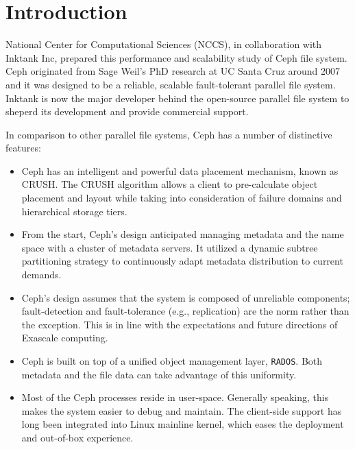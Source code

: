 \documentclass{article}
\begin{document}


\pagebreak
\thispagestyle{empty}
\tableofcontents

\pagebreak
\thispagestyle{empty}
\listoffigures

\clearpage
{}


\section{Introduction}

National Center for Computational Sciences (NCCS), in collaboration with
Inktank Inc, prepared this performance and scalability study of
Ceph file system. Ceph originated from Sage Weil's PhD research
at UC Santa Cruz around 2007 and it was designed to be a reliable, scalable
fault-tolerant parallel file system. Inktank is now the major developer behind
the open-source parallel file system to sheperd its development and provide
commercial support.

In comparison to other parallel file systems, Ceph has a number of distinctive
features:

\begin{itemize}
 
\item Ceph has an intelligent and powerful data placement mechanism, known as
  CRUSH. The CRUSH algorithm allows a client to pre-calculate object
  placement and layout while taking into consideration of failure domains and
  hierarchical storage tiers.
  
\item From the start, Ceph's design anticipated managing metadata and the name space
  with a cluster of metadata servers. It utilized a dynamic subtree partitioning
  strategy to continuously adapt metadata distribution to current demands.

\item Ceph's design assumes that the system is composed of unreliable
components; fault-detection and fault-tolerance (e.g., replication) are the
norm rather than the exception. This is in line with the expectations and
future directions of Exascale computing.

\item Ceph is built on top of a unified object management layer,
\texttt{RADOS}. Both metadata and the file data can take advantage of this
uniformity.

\item Most of the Ceph processes reside in user-space. Generally speaking, this makes the
system easier to debug and maintain. The client-side support has long been
integrated into Linux mainline kernel, which eases the deployment and out-of-box
experience.

\end{itemize}
\end{document}
